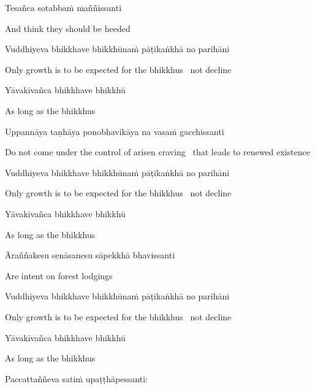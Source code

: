 Tesañca sotabbaṁ maññissanti

\begin{english}
  And think they should be heeded
\end{english}

Vuddhiyeva bhikkhave bhikkhūnaṁ pāṭikaṅkhā no parihāni

\begin{english}
  Only growth is to be expected for the bhikkhus \breathmark\ not decline
\end{english}

Yāvakīvañca bhikkhave bhikkhū

\begin{english}
  As long as the bhikkhus
\end{english}

Uppannāya taṇhāya ponobhavikāya na vasaṁ gacchissanti

\begin{english}
  Do not come under the control of arisen craving \breathmark\ that leads to renewed existence
\end{english}

Vuddhiyeva bhikkhave bhikkhūnaṁ pāṭikaṅkhā no parihāni

\begin{english}
  Only growth is to be expected for the bhikkhus \breathmark\ not decline
\end{english}

Yāvakīvañca bhikkhave bhikkhū

\begin{english}
  As long as the bhikkhus
\end{english}

Āraññakesu senāsanesu sāpekkhā bhavissanti

\begin{english}
  Are intent on forest lodgings
\end{english}

Vuddhiyeva bhikkhave bhikkhūnaṁ pāṭikaṅkhā no parihāni

\begin{english}
  Only growth is to be expected for the bhikkhus \breathmark\ not decline
\end{english}

Yāvakīvañca bhikkhave bhikkhū

\begin{english}
  As long as the bhikkhus
\end{english}

Paccattaññeva satiṁ upaṭṭhāpessanti:

